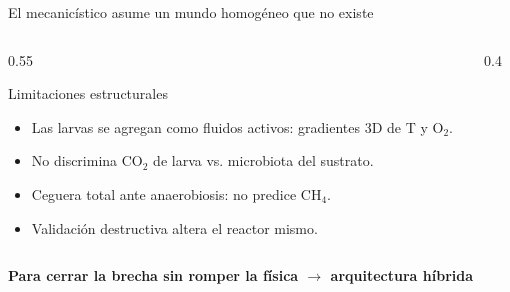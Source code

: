 \documentclass[aspectratio=169, 11pt]{beamer}
\begin{document}
\begin{frame}{El mecanic\'{i}stico asume un mundo homog\'{e}neo que no existe}
    \begin{columns}[T]
        \begin{column}{0.55\textwidth}
            \begin{alertblock}{Limitaciones estructurales}
                \begin{itemize}
                    \item Las larvas se agregan como fluidos activos: gradientes 3D de T y O$_2$.
                    \item No discrimina CO$_2$ de larva vs. microbiota del sustrato.
                    \item Ceguera total ante anaerobiosis: no predice CH$_4$.
                    \item Validaci\'{o}n destructiva altera el reactor mismo.
                \end{itemize}
            \end{alertblock}
        \end{column}
        \begin{column}{0.4\textwidth}
            \begin{center}
            \end{center}
        \end{column}
    \end{columns}

    \vfill
    \begin{center}
        \textbf{Para cerrar la brecha sin romper la f\'{i}sica $\rightarrow$ arquitectura h\'{i}brida}
    \end{center}
\end{frame}
\end{document}
